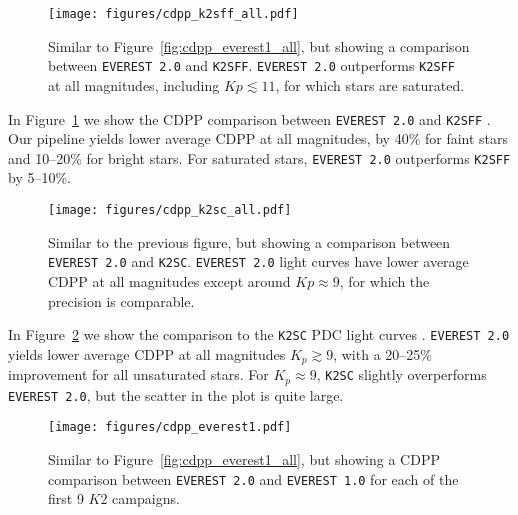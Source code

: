 \documentclass[]{emulateapj}
\newcommand{\Kp}{\ensuremath{Kp}}
\begin{document}
\begin{figure}[hbt]
  \begin{center}
      \texttt{[image: figures/cdpp\_k2sff\_all.pdf]}
       \caption{Similar to Figure~\ref{fig:cdpp_everest1_all}, but showing a comparison between \texttt{EVEREST 2.0} and \texttt{K2SFF}.
       \texttt{EVEREST 2.0} outperforms \texttt{K2SFF} at all magnitudes, including $\Kp \lesssim 11$, for which stars are saturated.}
     \label{fig:cdpp_k2sff_all}
  \end{center}
\end{figure}

In Figure~\ref{fig:cdpp_k2sff_all} we show the CDPP comparison between \texttt{EVEREST 2.0}
and \texttt{K2SFF} \citep{Vanderburg14,VanderburgJohnson14}. Our pipeline yields
lower average CDPP at all magnitudes, by 40\% for faint stars and 10--20\% for bright
stars. For saturated stars, \texttt{EVEREST 2.0} outperforms \texttt{K2SFF} by 5--10\%.

\begin{figure}[hbt]
  \begin{center}
      \texttt{[image: figures/cdpp\_k2sc\_all.pdf]}
       \caption{Similar to the previous figure, but showing a comparison between \texttt{EVEREST 2.0} and \texttt{K2SC}.
       \texttt{EVEREST 2.0} light curves have lower average CDPP at all magnitudes except around $\Kp \approx 9$, for which
       the precision is comparable.}
     \label{fig:cdpp_k2sc_all}
  \end{center}
\end{figure}

In Figure~\ref{fig:cdpp_k2sc_all} we show the comparison to the \texttt{K2SC} PDC
light curves \citep{Aigrain15,Aigrain16}. \texttt{EVEREST 2.0} yields lower average CDPP at all
magnitudes $K_p \gtrsim 9$, with a 20--25\% improvement for
all unsaturated stars. For $K_p \approx 9$, \texttt{K2SC} slightly overperforms
\texttt{EVEREST 2.0}, but the scatter in the plot is quite large.

\begin{figure}[hbt]
  \begin{center}
      \texttt{[image: figures/cdpp\_everest1.pdf]}
       \caption{Similar to Figure~\ref{fig:cdpp_everest1_all}, but showing a CDPP comparison between 
       \texttt{EVEREST 2.0} and \texttt{EVEREST 1.0} for each of the first 9 $K2$ campaigns.}
     \label{fig:cdpp_everest1}
  \end{center}
\end{figure}
\end{document}

